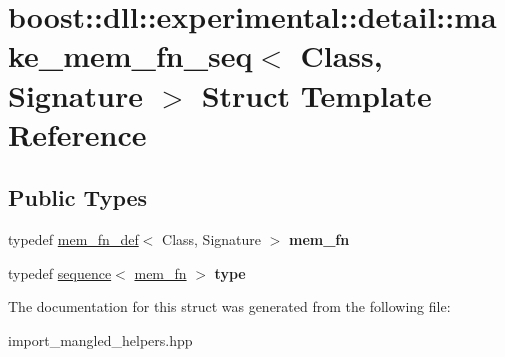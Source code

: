 \hypertarget{a01496}{}\section{boost\+:\+:dll\+:\+:experimental\+:\+:detail\+:\+:make\+\_\+mem\+\_\+fn\+\_\+seq$<$ Class, Signature $>$ Struct Template Reference}
\label{a01496}
\subsection*{Public Types}
\begin{DoxyCompactItemize}
\item 
\mbox{\label{a01496_add99b094e64960490544e8bef5cd6a24}} 
typedef \hyperlink{a01476}{mem\+\_\+fn\+\_\+def}$<$ Class, Signature $>$ {\bfseries mem\+\_\+fn}
\item 
\mbox{\label{a01496_ace226b4607233d6e491df32c3393ab23}} 
typedef \hyperlink{a01432}{sequence}$<$ \hyperlink{a01476}{mem\+\_\+fn} $>$ {\bfseries type}
\end{DoxyCompactItemize}


The documentation for this struct was generated from the following file\+:\begin{DoxyCompactItemize}
\item 
import\+\_\+mangled\+\_\+helpers.\+hpp\end{DoxyCompactItemize}
